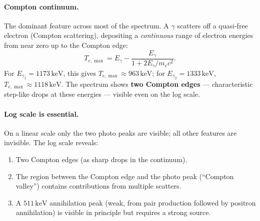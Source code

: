 \paragraph{Compton continuum.}
The dominant feature across most of the spectrum.  A $\gamma$ scatters
off a quasi-free electron (Compton scattering), depositing a \emph{continuous}
range of electron energies from near zero up to the Compton edge:
\begin{equation}
  \label{eq:lec07:compton_edge_spectrum}
  T_{e,\max} = E_\gamma - \frac{E_\gamma}{1 + 2E_\gamma/m_e c^2}.
\end{equation}
For $E_{\gamma_1} = 1173\,\text{keV}$, this gives $T_{e,\max} \approx 963\,\text{keV}$;
for $E_{\gamma_2} = 1333\,\text{keV}$, $T_{e,\max} \approx 1118\,\text{keV}$.
The spectrum shows \textbf{two Compton edges} — characteristic step-like drops
at these energies — visible even on the log scale.

\paragraph{Log scale is essential.}
On a linear scale only the two photo peaks are visible; all other features are
invisible.  The log scale reveals:
\begin{enumerate}
  \item Two Compton edges (as sharp drops in the continuum).
  \item The region between the Compton edge and the photo peak
  (``Compton valley'') contains contributions from multiple scatters.
  \item A $511\,\text{keV}$ annihilation peak (weak, from pair production
  followed by positron annihilation) is visible in principle but requires
  a strong source.
\end{enumerate}


